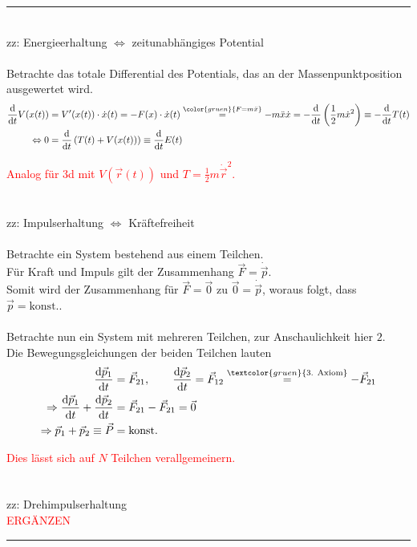 \documentclass{article}
\newcommand{\diff}{\mathrm{d}}
\newcommand{\lr}[1]{\left(#1\right)}
\newcommand{\commenttext}[1]{\textcolor{gruen}{\text{#1}}}
\newcommand{\comment}[1]{{\color{gruen} {#1}}}
\begin{document}
{\color{violet}
\hrule
	\\
	zz: Energieerhaltung $\Leftrightarrow$ zeitunabhängiges Potential\\
	\\
	Betrachte das totale Differential des Potentials, das an der Massenpunktposition ausgewertet wird.
		\begin{align*}
			\frac{\diff}{\diff t} V(x(t)) &= V'(x(t)) \cdot \dot{x}(t) = -F(x)\cdot \dot{x}(t) \stackrel{\comment{F = m\ddot{x}}}{=} -m\ddot{x}\dot{x} = -\frac{\diff}{\diff t} \lr{ \frac{1}{2} m\dot{x}^2 } \equiv -\frac{\diff}{\diff t} T(t) \\
			\Leftrightarrow 0 &= \frac{\diff}{\diff t} \lr{T(t) + V(x(t))} \equiv \frac{\diff}{\diff t} E(t)
		\end{align*}
	
	\textcolor{red}{Analog für 3d mit $V(\vec{r}(t))$ und $T = \frac{1}{2}m\dot{\vec{r}}^2$.}\\
	\\
	\\
	zz: Impulserhaltung $\Leftrightarrow$ Kräftefreiheit\\
	\\
	Betrachte ein System bestehend aus einem Teilchen.\\
	Für Kraft und Impuls gilt der Zusammenhang $\vec{F} = \dot{\vec{p}}$.\\
	Somit wird der Zusammenhang für $\vec{F} = \vec{0}$ zu $\vec{0} = \dot{\vec{p}}$, woraus folgt, dass $\vec{p} = \text{konst.}$.\\
	\\
	Betrachte nun ein System mit mehreren Teilchen, zur Anschaulichkeit hier $2$.\\
	Die Bewegungsgleichungen der beiden Teilchen lauten
		\begin{align*}
			\frac{\diff \vec{p}_1}{\diff t} &= \vec{F}_{21},\qquad \frac{\diff \vec{p}_2}{\diff t} = \vec{F}_{12} \stackrel{\commenttext{3. Axiom}}{=} -\vec{F}_{21} \\
				\Rightarrow \frac{\diff \vec{p}_1}{\diff t} + \frac{\diff \vec{p}_2}{\diff t} &= \vec{F}_{21} - \vec{F}_{21} = \vec{0} \\
				\Rightarrow \vec{p}_1 + \vec{p}_2 \equiv \vec{P} &= \text{konst.}
		\end{align*}
		
	\textcolor{red}{Dies lässt sich auf $N$ Teilchen verallgemeinern.}\\
	\\
	\\
	zz: Drehimpulserhaltung\\
	\textcolor{red}{ERGÄNZEN}
\hrule
}
\end{document}
